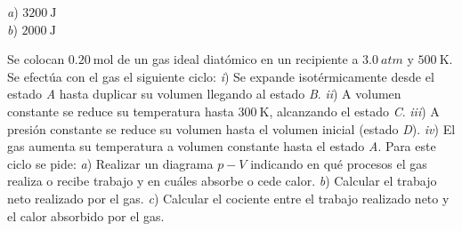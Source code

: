 \begin{Answer}
	\begin{minipage}[t]{.4\textwidth}
    \textit{a}) $\SI{3200}{\joule}$\\ \textit{b}) $\SI{2000}{\joule}$
  \end{minipage}
\end{Answer}
%
\begin{center}
\end{center}
%
\begin{Exercise}
  {}{}
  Se colocan $\SI{0.20}{\mole}$ de un gas ideal diatómico en un recipiente a $\SI{3.0}{atm}$ y $\SI{500}{\kelvin}$. Se efectúa con el gas el siguiente ciclo: \textit{i}) Se expande isotérmicamente desde el estado \textit{A} hasta duplicar su volumen llegando al estado \textit{B}. \textit{ii}) A volumen constante se reduce su temperatura hasta $\SI{300}{\kelvin}$, alcanzando el estado \textit{C}. \textit{iii}) A presión constante se reduce su volumen hasta el volumen inicial (estado \textit{D}). \textit{iv}) El gas aumenta su temperatura a volumen constante hasta el estado \textit{A}. Para este ciclo se pide: \textit{a}) Realizar un diagrama $p-V$ indicando en qué procesos el gas realiza o recibe trabajo y en cuáles absorbe o cede calor. \textit{b}) Calcular el trabajo neto realizado por el gas. \textit{c}) Calcular el cociente entre el trabajo realizado neto y el calor absorbido por el gas.
\end{Exercise}
